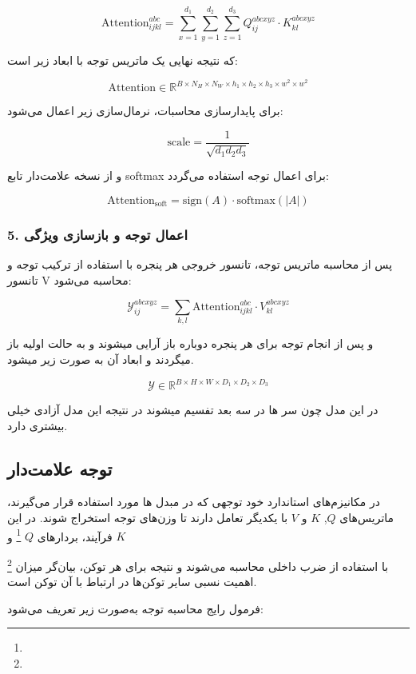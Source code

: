 \[
\text{Attention}_{ijkl}^{abc} = \sum_{x=1}^{d_1} \sum_{y=1}^{d_2} \sum_{z=1}^{d_3} Q_{ij}^{abcxyz} \cdot K_{kl}^{abcxyz}
\]

که نتیجه نهایی یک ماتریس توجه با ابعاد زیر است:

\[
\text{Attention} \in \mathbb{R}^{B \times N_H \times N_W \times h_1 \times h_2 \times h_3 \times w^2 \times w^2}
\]

برای پایدارسازی محاسبات، نرمال‌سازی زیر اعمال می‌شود:

\[
\text{scale} = \frac{1}{\sqrt{d_1 d_2 d_3}}
\]

و از نسخه علامت‌دار تابع softmax برای اعمال توجه استفاده می‌گردد:

\[
\text{Attention}_{\text{soft}} = \text{sign}(A) \cdot \text{softmax}(|A|)
\]

\subsubsection*{5. اعمال توجه و بازسازی ویژگی}

پس از محاسبه ماتریس توجه، تانسور خروجی هر پنجره با استفاده از ترکیب توجه و تانسور V محاسبه می‌شود:

\[
\mathcal{Y}_{ij}^{abcxyz} = \sum_{k,l} \text{Attention}_{ijkl}^{abc} \cdot V_{kl}^{abcxyz}
\]

و پس از انجام توجه برای هر پنجره دوباره باز آرایی میشوند و به حالت اولیه باز میگردند و ابعاد آن به صورت زیر میشود.

\[
\mathcal{Y} \in \mathbb{R}^{B \times H \times W \times D_1 \times D_2 \times D_3}
\]

در این مدل چون سر ها در سه بعد تفسیم میشوند در نتیجه این مدل آزادی خیلی بیشتری دارد.






\subsection{توجه علامت‌دار}

در مکانیزم‌های استاندارد خود توجهی که در مبدل ها مورد استفاده قرار می‌گیرند، ماتریس‌های $Q$, $K$ و $V$ با یکدیگر تعامل دارند تا وزن‌های توجه استخراج شوند. در این فرآیند، بردارهای $Q$  \footnote{}
 و $K$ 
 
 \footnote{}
  با استفاده از ضرب داخلی محاسبه می‌شوند و نتیجه برای هر توکن، بیان‌گر میزان اهمیت نسبی سایر توکن‌ها در ارتباط با آن توکن است.

فرمول رایج محاسبه توجه به‌صورت زیر تعریف می‌شود:

